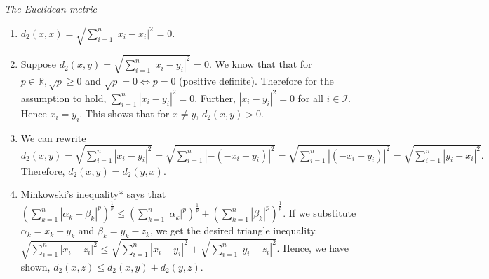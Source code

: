 \begin{frame}
\textit{The Euclidean metric}\hfill\break
\begin{enumerate}
    \item $d_2(x,x) = \sqrt{\sum_{i=1}^{n} |x_i - x_i|^2} = 0$.
    \item Suppose $d_2(x,y) = \sqrt{\sum_{i=1}^{n} |x_i - y_i|^2} = 0$. We know
    that that for $p \in \mathbb{R}, \sqrt{p}\geq0$ and $\sqrt{p} = 0 \iff p =
    0$ (positive definite). Therefore for the assumption to hold,
    $\sum_{i=1}^{n} |x_i - y_i|^2 = 0$. Further, $ |x_i - y_i|^2 = 0$ for all $i
    \in \mathcal{I}$. Hence $x_i = y_i$. This shows that for $x\neq y$,
    $d_2(x,y)>0$.
    \item We can rewrite $d_2(x,y) = \sqrt{\sum_{i=1}^{n} |x_i - y_i|^2} =
    \sqrt{\sum_{i=1}^{n} |- (- x_i + y_i)|^2} = \sqrt{\sum_{i=1}^{n} |(- x_i +
    y_i)|^2} = \sqrt{\sum_{i=1}^{n} |y_i - x_i|^2}.$ Therefore, $d_2(x,y) =
    d_2(y,x).$
    \item Minkowski's inequality* says that
    $(\sum_{k=1}^{n}|\alpha_k+\beta_k|^p)^\frac{1}{p} \leq
    (\sum_{k=1}^{n}|\alpha_k|^p)^\frac{1}{p} +
    (\sum_{k=1}^{n}|\beta_k|^p)^\frac{1}{p}$. If we substitute $\alpha_k =
    x_k-y_k$ and $\beta_k = y_k - z_k$, we get the desired triangle inequality. %
    $ \sqrt{\sum_{i=1}^{n} |x_i - z_i|^2} \leq  \sqrt{\sum_{i=1}^{n} |x_i -
    y_i|^2} +  \sqrt{\sum_{i=1}^{n} |y_i - z_i|^2}$. Hence, we have shown,
    $d_2(x,z) \leq d_2(x,y)+d_2(y,z).$
\end{enumerate}
\end{frame}


